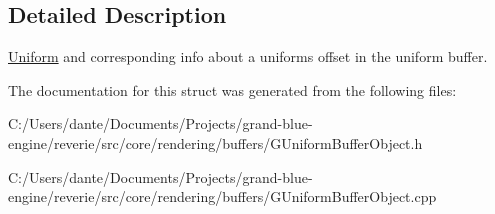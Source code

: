 \subsection{Detailed Description}
\mbox{\hyperlink{structrev_1_1_uniform}{Uniform}} and corresponding info about a uniform\textquotesingle{}s offset in the uniform buffer. 

The documentation for this struct was generated from the following files\+:\begin{DoxyCompactItemize}
\item 
C\+:/\+Users/dante/\+Documents/\+Projects/grand-\/blue-\/engine/reverie/src/core/rendering/buffers/G\+Uniform\+Buffer\+Object.\+h\item 
C\+:/\+Users/dante/\+Documents/\+Projects/grand-\/blue-\/engine/reverie/src/core/rendering/buffers/G\+Uniform\+Buffer\+Object.\+cpp\end{DoxyCompactItemize}
